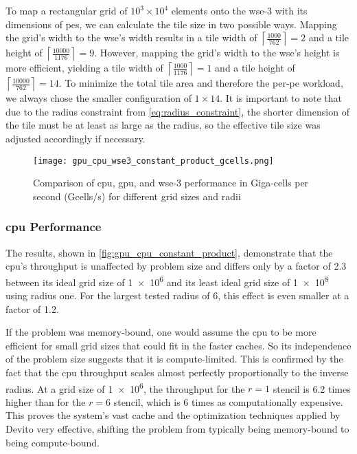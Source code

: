 To map a rectangular grid of $10^3\times 10^4$ elements onto the \ac{wse}-3 with its dimensions of  \acp{pe}, we can calculate the tile size in two possible ways. Mapping the grid's width to the \ac{wse}'s width results in a tile width of $\left\lceil \frac{1000}{762} \right\rceil = 2$ and a tile height of $\left\lceil \frac{10000}{1176} \right\rceil = 9$. However, mapping the grid's width to the \ac{wse}'s height is more efficient, yielding a tile width of $\left\lceil \frac{1000}{1176} \right\rceil = 1$ and a tile height of $\left\lceil \frac{10000}{762} \right\rceil = 14$. To minimize the total tile area and therefore the per-\ac{pe} workload, we always chose the smaller configuration of $1 \times 14$. It is important to note that due to the radius constraint from \autoref{eq:radius_constraint}, the shorter dimension of the tile must be at least as large as the radius, so the effective tile size was adjusted accordingly if necessary.

\begin{figure}[h]
    \centering
    \texttt{[image: gpu\_cpu\_wse3\_constant\_product\_gcells.png]}
    \caption{Comparison of \ac{cpu}, \ac{gpu}, and \ac{wse}-3 performance in Giga-cells per second (Gcells/s) for different grid sizes and radii}
    \label{fig:gpu_cpu_constant_product}
\end{figure}

\subsubsection{\ac{cpu} Performance}
The results, shown in \autoref{fig:gpu_cpu_constant_product}, demonstrate that the \ac{cpu}'s throughput is unaffected by problem size and differs only by a factor of \num{2.3} between its ideal grid size of \num{1e6} and its least ideal grid size of \num{1e8} using radius one. For the largest tested radius of \num{6}, this effect is even smaller at a factor of \num{1.2}.

If the problem was memory-bound, one would assume the \ac{cpu} to be more efficient for small grid sizes that could fit in the faster caches. So its independence of the problem size suggests that it is compute-limited.
This is confirmed by the fact that the \ac{cpu} throughput scales almost perfectly proportionally to the inverse radius.
At a grid size of \num{1e6}, the throughput for the $r=1$ stencil is \num{6.2} times higher than for the $r=6$ stencil, which is \num{6} times as computationally expensive. This proves the system's vast cache and the optimization techniques applied by Devito very effective, shifting the problem from typically being memory-bound to being compute-bound. 

